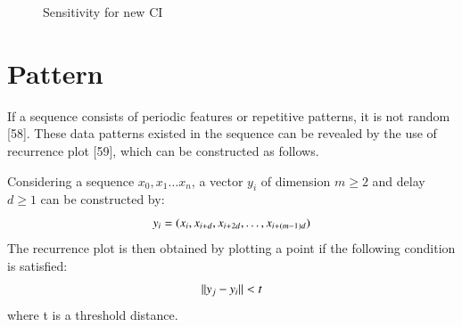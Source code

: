 \begin{figure}
 \hspace{0.5cm}
\caption{Sensitivity for new CI}
\label{Sensitivity for new CI}
\end{figure}


\section{Pattern}
If a sequence consists of periodic features or repetitive patterns, it is not random [58]. These data patterns existed in the sequence can be revealed by the use of recurrence plot [59], which can be constructed as follows.

Considering a sequence ${x_0,x_1\ldots x_n}$, a vector $y_i$ of dimension $m\geqslant2$ and delay $d\geqslant1$ can be constructed by:
\begin{equation}
\centering
y_i=(x_i,x_{i+d},x_{i+2d},\ldots,x_{i+(m-1)d})
\end{equation}
The recurrence plot is then obtained by plotting a point if the following condition is satisfied:
\begin{equation}
\centering
||y_j-y_i||<t
\end{equation}
where t is a threshold distance.

